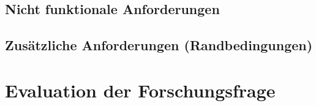     \subsection*{Nicht funktionale Anforderungen}
    
    \subsection*{Zusätzliche Anforderungen (Randbedingungen)}


\section{Evaluation der Forschungsfrage}